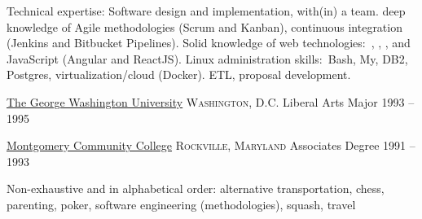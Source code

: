 \documentclass[10pt,a4paper]{article}
\begin{document}
{{    }
     \vspace{0.5em}
    {}

    
  }

\vspace{1em}

\spacedhrule{-0.2em}{-0.4em}


\inlineheadsection  %
  {Technical expertise:}
  {Software design and implementation, with(in) a team.  deep knowledge of Agile methodologies (Scrum and Kanban), continuous integration (Jenkins and Bitbucket Pipelines). Solid knowledge of web technologies:\ , , ,  and JavaScript (Angular and ReactJS).  Linux administration skills:\ Bash, My, DB2, Postgres, virtualization/cloud (Docker). ETL, proposal development.}


\spacedhrule{2em}{-0.4em}


\headedsection
  {\href{https://www.gwu.edu}{The George Washington University}}
  {\textsc{Washington, D.C.}} {%
  \headedsubsection
    {Liberal Arts Major}
    {1993 -- 1995}
    {}
}

\headedsection
  {\href{https://www.montgomerycollege.edu}{Montgomery Community College}}
  {\textsc{Rockville, Maryland}} {%
  \headedsubsection
    {Associates Degree}
    {1991 -- 1993} {}
}

\vspace{0.5em}

\spacedhrule{1.6em}{-0.4em}


\inlineheadsection
  {Non-exhaustive and in alphabetical order:}
  {alternative transportation, chess, parenting, poker, software engineering (methodologies), squash, travel}
\end{document}
